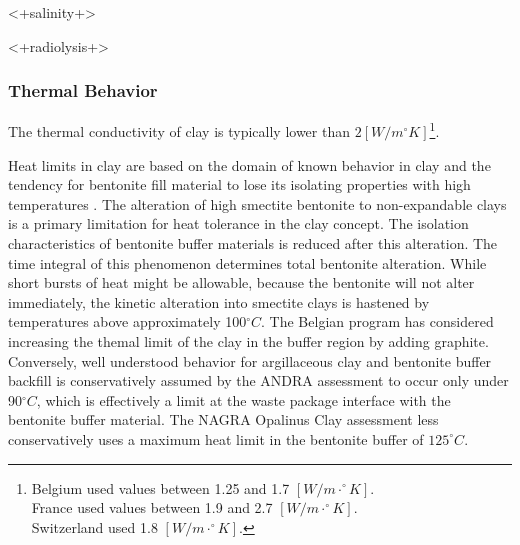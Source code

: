 {<+salinity+>

<+radiolysis+>

\subsubsection{Thermal Behavior}

The thermal conductivity of clay is typically lower than 
$2[W/m^{\circ}K]$\footnote{
Belgium used values between 1.25 and 1.7 $[W/m\cdot^{\circ}K]$.\\
France used values between 1.9 and 2.7 $[W/m\cdot^{\circ}K]$.\\
Switzerland used 1.8 $[W/m\cdot^{\circ}K]$.
}.

Heat limits in clay are based on the domain of known behavior in clay and the 
tendency for bentonite fill material to lose its isolating properties with high 
temperatures \cite{andra_argile:_2005, pusch_alteration_1987}. 
The alteration of high smectite bentonite to non-expandable clays is a primary 
limitation for heat tolerance in the clay concept. The isolation characteristics 
of bentonite buffer materials is reduced after this alteration. The time 
integral of this phenomenon determines total bentonite alteration. While short 
bursts of heat might be allowable, because the bentonite will not alter 
immediately, the kinetic alteration into smectite clays is hastened by 
temperatures above approximately 100$^{\circ}C$\cite{pusch_alteration_1987}. 
The Belgian program has considered increasing the themal limit of the clay in
the buffer region by adding graphite.
Conversely, well understood behavior for argillaceous clay and bentonite buffer backfill
is conservatively assumed by the \gls{ANDRA} assessment to occur only under  
90$^{\circ}C$, which is effectively a limit at the waste package interface with 
the bentonite buffer material.\cite{andra_argile:_2005} 
The \gls{NAGRA} Opalinus Clay assessment less conservatively 
uses a maximum heat limit in the bentonite buffer of $125^{\circ}C$.
\cite{johnson_project_2002} 


% 

}
